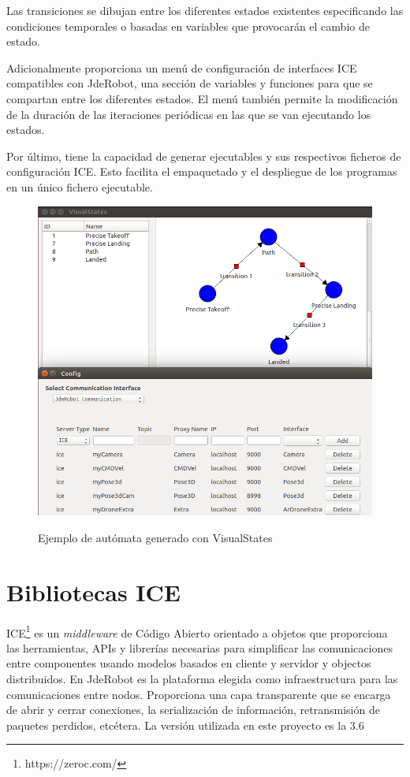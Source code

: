 {	Las transiciones se dibujan entre los diferentes estados existentes especificando las condiciones temporales o basadas en variables que provocarán el cambio de estado.
	
	Adicionalmente proporciona un menú de configuración de interfaces ICE compatibles con JdeRobot, una sección de variables y funciones para que se compartan entre los diferentes estados. El menú también permite la modificación de la duración de las iteraciones periódicas en las que se van ejecutando los estados.
	
	Por último, tiene la capacidad de generar ejecutables y sus respectivos ficheros de configuración ICE. Esto facilita el empaquetado y el despliegue de los programas en un único fichero ejecutable.
	
	\begin{figure}[H]
		\centering
		{\includegraphics[scale=0.45]{imag/IMG32.png}}
		\caption{Ejemplo de autómata generado con VisualStates}
		
		\label{FIG:33_visualstates}
	\end{figure} 
	
	\section{Bibliotecas ICE}
	
	ICE\footnote{https://zeroc.com/} es un \textit{middleware} de Código Abierto orientado a objetos que proporciona las herramientas, APIs y librerías necesarias para simplificar las comunicaciones entre componentes usando modelos basados en cliente y servidor y objectos distribuidos. En JdeRobot es la plataforma elegida como infraestructura para las comunicaciones entre nodos. Proporciona una capa transparente que se encarga de abrir y cerrar conexiones, la serialización de información, retransmisión de paquetes perdidos, etcétera. La versión utilizada en este proyecto es la 3.6
	
}
